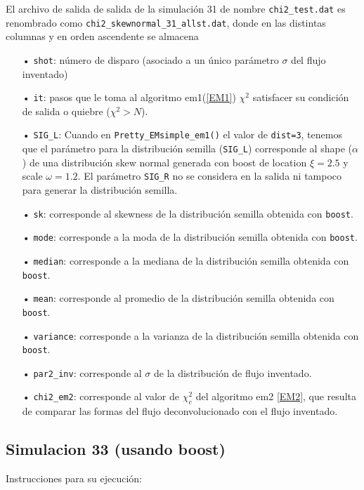 \documentclass[11pt,letterpaper]{article}
\begin{document}
El archivo de salida de salida de la simulación 31 de nombre \verb|chi2_test.dat| es renombrado como \verb|chi2_skewnormal_31_allst.dat|, donde en las distintas columnas y en orden ascendente se almacena 

\begin{itemize}
\item[•] \verb|shot|: número de disparo (asociado a un único parámetro $\sigma$ del flujo inventado)
\item[•] \verb|it|: pasos que le toma al algoritmo em1(\ref{EM1}) $\chi^2$ satisfacer su condición de salida o quiebre ($\chi^2>N$). 
\item[•] \verb|SIG_L|: Cuando en  \verb|Pretty_EMsimple_em1()| el valor de \verb|dist=3|, tenemos que el parámetro para la distribución semilla (\verb|SIG_L|) corresponde al shape ($\alpha$) de una distribución skew normal generada con boost de location $\xi=2.5$ y scale $\omega=1.2$. El parámetro \verb|SIG_R| no se considera en la salida ni tampoco para generar la distribución semilla.
\item[•] \verb|sk|: corresponde al skewness de la distribución semilla obtenida con \verb|boost|.
\item[•] \verb|mode|: corresponde a la moda de la distribución semilla obtenida con \verb|boost|.
\item[•] \verb|median|: corresponde a la mediana de la distribución semilla obtenida con \verb|boost|.
\item[•] \verb|mean|: corresponde al promedio de la distribución semilla obtenida con \verb|boost|.
\item[•] \verb|variance|: corresponde a la varianza de la distribución semilla obtenida con \verb|boost|.
\item[•] \verb|par2_inv|: corresponde al $\sigma$ de la distribución de flujo inventado.
\item[•] \verb|chi2_em2|: corresponde al valor de $\chi^2_c$ del algoritmo em2 \ref{EM2}, que resulta de comparar las formas del flujo deconvolucionado con el flujo inventado.
\end{itemize}


\subsection*{Simulacion 33 (usando boost)}

Instrucciones para su ejecución:
\end{document}
